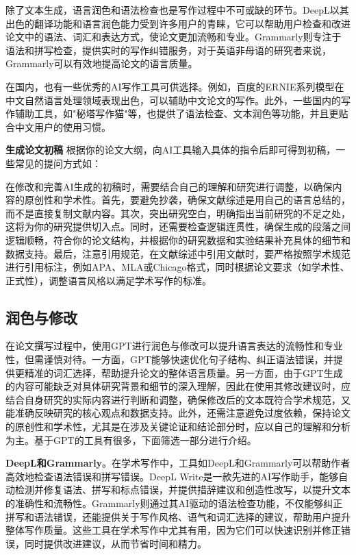 除了文本生成，语言润色和语法检查也是写作过程中不可或缺的环节。DeepL以其出色的翻译功能和语言润色能力受到许多用户的青睐，它可以帮助用户检查和改进论文中的语法、词汇和表达方式，使论文更加流畅和专业。Grammarly则专注于语法和拼写检查，提供实时的写作纠错服务，对于英语非母语的研究者来说，Grammarly可以有效地提高论文的语言质量。

在国内，也有一些优秀的AI写作工具可供选择。例如，百度的ERNIE系列模型在中文自然语言处理领域表现出色，可以辅助中文论文的写作。此外，一些国内的写作辅助工具，如"秘塔写作猫"等，也提供了语法检查、文本润色等功能，并且更贴合中文用户的使用习惯。


\textbf{生成论文初稿}
根据你的论文大纲，向AI工具输入具体的指令后即可得到初稿，一些常见的提问方式如：

在修改和完善AI生成的初稿时，需要结合自己的理解和研究进行调整，以确保内容的原创性和学术性。首先，要避免抄袭，确保文献综述是用自己的语言总结的，而不是直接复制文献内容。其次，突出研究空白，明确指出当前研究的不足之处，这将为你的研究提供切入点。同时，还需要检查逻辑连贯性，确保生成的段落之间逻辑顺畅，符合你的论文结构，并根据你的研究数据和实验结果补充具体的细节和数据支持。最后，注意引用规范，在文献综述中引用文献时，要严格按照学术规范进行引用标注，例如APA、MLA或Chicago格式，同时根据论文要求（如学术性、正式性），调整语言风格以满足学术写作的标准。

\subsection{润色与修改}

在论文撰写过程中，使用GPT进行润色与修改可以提升语言表达的流畅性和专业性，但需谨慎对待。一方面，GPT能够快速优化句子结构、纠正语法错误，并提供更精准的词汇选择，帮助提升论文的整体语言质量。另一方面，由于GPT生成的内容可能缺乏对具体研究背景和细节的深入理解，因此在使用其修改建议时，应结合自身研究的实际内容进行判断和调整，确保修改后的文本既符合学术规范，又能准确反映研究的核心观点和数据支持。此外，还需注意避免过度依赖，保持论文的原创性和学术性，尤其是在涉及关键论证和结论部分时，应以自己的理解和分析为主。基于GPT的工具有很多，下面筛选一部分进行介绍。

\textbf{DeepL和Grammarly}。在学术写作中，工具如DeepL和Grammarly可以帮助作者高效地检查语法错误和拼写错误。DeepL Write是一款先进的AI写作助手，能够自动检测并修复语法、拼写和标点错误，并提供措辞建议和创造性改写，以提升文本的准确性和流畅性。Grammarly则通过其AI驱动的语法检查功能，不仅能够纠正拼写和语法错误，还能提供关于写作风格、语气和词汇选择的建议，帮助用户提升整体写作质量。这些工具在学术写作中尤其有用，因为它们可以快速识别并修正错误，同时提供改进建议，从而节省时间和精力。


